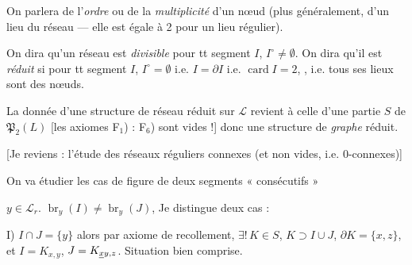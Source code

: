 \documentclass[11pt,a4paper]{article}
\begin{document}
On parlera de l'\emph{ordre} ou de la \emph{multiplicité} d'un nœud (plus généralement, d'un lieu du réseau --- elle est égale à 2 pour un lieu régulier).

On dira qu'un  réseau est \emph{divisible}  \ill{} pour tt segment $I$, $I^{\circ} \neq \emptyset$. On dira qu'il est \emph{réduit} si pour tt segment $I$, $I^{\circ} = \emptyset$ i.e. $I = \partial I$ i.e. $\operatorname{card} I = 2$, , i.e. tous ses lieux sont des nœuds.


La donnée d'une structure de réseau réduit sur $\mathcal{L}$ revient à celle d'une  partie $S$ de $\mathfrak{P}_2(L)$ [les axiomes F$_1$) : F$_6$) sont vides !] donc une structure de \emph{graphe} réduit.


[Je reviens : l'étude des réseaux réguliers  connexes (et non vides, i.e. 0-connexes)]

 On va étudier les cas de figure de deux segments « consécutifs »


$y \in \mathcal{L}_r$.  $\operatorname{br}_y(I) \neq \operatorname{br}_y(J)$, Je distingue deux cas :

I) $I \cap J = \{y\}$ alors \struck{\ill{}} par axiome de recollement, $\exists !\, K \in S$, $K \supset I \cup J$, $\partial K = \{x, z\}$, et $I = K_{x,y}$, $J = K_{\struck{x}y,z}$. Situation bien comprise.



\end{document}
